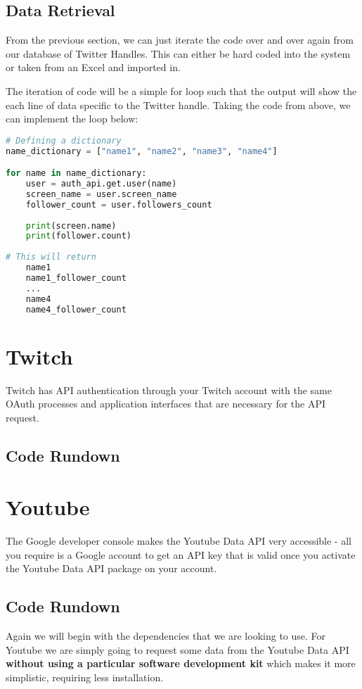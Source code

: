 \documentclass[12pt, letterpaper]{article}
\begin{document}
\subsection{Data Retrieval}
From the previous section, we can just iterate the code over and over again from our database of Twitter Handles. This can either be hard coded into the system or taken from an Excel and imported in.

The iteration of code will be a simple for loop such that the output will show the each line of data specific to the Twitter handle. Taking the code from above, we can implement the loop below:

\begin{lstlisting}[language=python]
# Defining a dictionary
name_dictionary = ["name1", "name2", "name3", "name4"]

for name in name_dictionary:
	user = auth_api.get.user(name)
	screen_name = user.screen_name
	follower_count = user.followers_count
	
	print(screen.name)
	print(follower.count)
	
# This will return
	name1
	name1_follower_count
	...
	name4
	name4_follower_count

\end{lstlisting}

\newpage
\section{Twitch}
Twitch has API authentication through your Twitch account with the same OAuth processes and application interfaces that are necessary for the API request.
\subsection{Code Rundown}

\newpage
\section{Youtube}
The Google developer console makes the Youtube Data API very accessible - all you require is a Google account to get an API key that is valid once you activate the Youtube Data API package on your account.
\subsection{Code Rundown}
Again we will begin with the dependencies that we are looking to use. For Youtube we are simply going to request some data from the Youtube Data API \textbf{without using a particular software development kit} which makes it more simplistic, requiring less installation.
\end{document}
